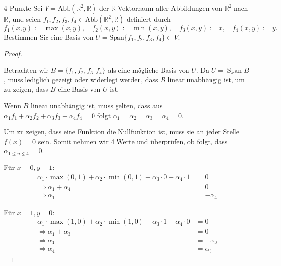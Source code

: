 \documentclass{problemset}
\begin{document}
\begin{problem}{4 Punkte}
Sei $V = \text{Abb}(\mathbb{R}^2, \mathbb{R})$ der $\mathbb{R}$-Vektorraum aller Abbildungen von $\mathbb{R}^2$ nach $\mathbb{R}$, und seien $f_1, f_2, f_3, f_4 \in \text{Abb}(\mathbb{R}^2, \mathbb{R})$ definiert durch
\[ f_1(x, y) := \max(x, y), \quad f_2(x, y) := \min(x, y), \quad f_3(x, y) := x, \quad f_4(x, y) := y. \]
Bestimmen Sie eine Basis von $U = \text{Span}\{f_1, f_2, f_3, f_4\} \subset V$.
\begin{proof}
    $ $

    Betrachten wir $B = \{f_1, f_2, f_3, f_4\}$ als eine mögliche Basis von $U$. Da
    $U = \operatorname{Span} B$, muss lediglich gezeigt oder widerlegt werden, dass
    $B$ linear unabhängig ist, um zu zeigen, dass $B$ eine Basis von $U$ ist.

    Wenn $B$ linear unabhängig ist, muss gelten, dass aus $\alpha_1 f_1 + \alpha_2
        f_2 + \alpha_3 f_3 + \alpha_4 f_4 = 0$ folgt $\alpha_1 = \alpha_2 = \alpha_3 =
        \alpha_4 = 0$.

    Um zu zeigen, dass eine Funktion die Nullfunktion ist, muss sie an jeder Stelle
    $f(x) = 0$ sein. Somit nehmen wir 4 Werte und überprüfen, ob folgt, dass
    $\alpha_{1 \le n \le 4} = 0$.

    Für $x = 0, y = 1$:
    \begin{align*}
        \alpha_1 \cdot \max(0, 1) + \alpha_2 \cdot \min(0, 1) + \alpha_3 \cdot 0 + \alpha_4 \cdot 1 & = 0         \\
        \Rightarrow \alpha_1 + \alpha_4                                                             & = 0         \\
        \Rightarrow \alpha_1                                                                        & = -\alpha_4
    \end{align*}

    Für $x = 1, y = 0$:
    \begin{align*}
        \alpha_1 \cdot \max(1, 0) + \alpha_2 \cdot \min(1, 0) + \alpha_3 \cdot 1 + \alpha_4 \cdot 0 & = 0         \\
        \Rightarrow \alpha_1 + \alpha_3                                                             & = 0         \\
        \Rightarrow \alpha_1                                                                        & = -\alpha_3 \\
        \Rightarrow \alpha_4                                                                        & = \alpha_3
    \end{align*}


\end{proof}
\end{problem}
\end{document}
